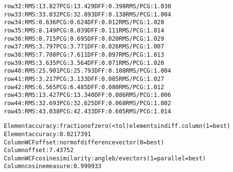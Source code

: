 \begin{alltt}
row  32:  RMS:  13.827    PCG:  13.429    DFF:   0.398    RMS/PCG:   1.030    
row  33:  RMS:  33.032    PCG:  32.893    DFF:   0.138    RMS/PCG:   1.004    
row  34:  RMS:   0.636    PCG:   0.624    DFF:   0.012    RMS/PCG:   1.020    
row  35:  RMS:   8.149    PCG:   8.039    DFF:   0.111    RMS/PCG:   1.014    
row  36:  RMS:   0.715    PCG:   0.695    DFF:   0.020    RMS/PCG:   1.029    
row  37:  RMS:   3.797    PCG:   3.771    DFF:   0.026    RMS/PCG:   1.007    
row  38:  RMS:   7.708    PCG:   7.611    DFF:   0.097    RMS/PCG:   1.013    
row  39:  RMS:   3.635    PCG:   3.564    DFF:   0.071    RMS/PCG:   1.020    
row  40:  RMS:  25.901    PCG:  25.793    DFF:   0.108    RMS/PCG:   1.004    
row  41:  RMS:   3.217    PCG:   3.133    DFF:   0.085    RMS/PCG:   1.027    
row  42:  RMS:   6.565    PCG:   6.485    DFF:   0.080    RMS/PCG:   1.012    
row  43:  RMS:  13.427    PCG:  13.340    DFF:   0.086    RMS/PCG:   1.006    
row  44:  RMS:  32.693    PCG:  32.625    DFF:   0.068    RMS/PCG:   1.002    
row  45:  RMS:  43.038    PCG:  42.433    DFF:   0.605    RMS/PCG:   1.014    

Element accuracy: fraction of zero (<tol) elements in diff. column (1=best)
Element accuracy:  0.0217391
Column WCF offset: norm of difference vector (0=best)
Column offset:  7.43752
Column WCF cosine similarity: angle b/e vectors (1=parallel=best)
Column cosine measure:  0.999933
\end{alltt}
